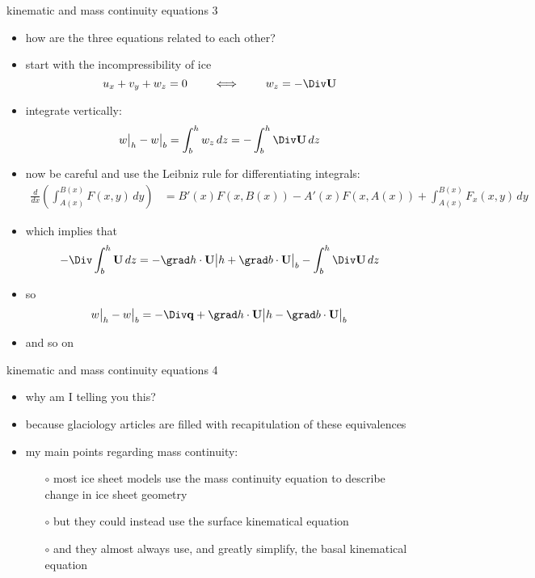 \begin{frame}{kinematic and mass continuity equations 3}

\begin{itemize}
\small
\item how are the three equations related to each other?
\item start with the incompressibility of ice
    $$u_x + v_y + w_z = 0 \qquad \iff \qquad w_z = - \Div \mathbf{U}$$
\item integrate vertically:
    $$w\big|_h - w\big|_b = \int_b^h w_z\,dz = - \int_b^h \Div \mathbf{U}\,dz$$
\item now be careful and use the Leibniz rule for differentiating integrals:
\scriptsize
  \begin{align*}
\frac{d}{dx}\left(\int_{A(x)}^{B(x)} F(x,y)\,dy\right) &= B'(x) F(x,B(x)) - A'(x) F(x,A(x)) + \int_{A(x)}^{B(x)} F_x(x,y)\,dy
  \end{align*}
\small
\item which implies that
   $$- \Div \int_b^h \mathbf{U}\,dz = - \grad h \cdot \mathbf{U}\big|h + \grad b \cdot \mathbf{U}\big|_b - \int_b^h \Div \mathbf{U}\,dz$$
\item so
    $$w\big|_h - w\big|_b = - \Div \mathbf{q} + \grad h \cdot \mathbf{U}\big|h - \grad b \cdot \mathbf{U}\big|_b$$
\item and so on
\normalsize
\end{itemize}
\end{frame}


\begin{frame}{kinematic and mass continuity equations 4}

\begin{itemize}
\item why am I telling you this?
\item because glaciology articles are filled with recapitulation of these equivalences

\vspace{5mm}
\item my main points regarding mass continuity:
  \begin{itemize}
  \item[$\circ$] most ice sheet models use the mass continuity equation to describe change in ice sheet geometry
  \item[$\circ$] but they could instead use the surface kinematical equation
  \item[$\circ$] and they almost always use, and greatly simplify, the basal kinematical equation
  \end{itemize}
\end{itemize}
\end{frame}


